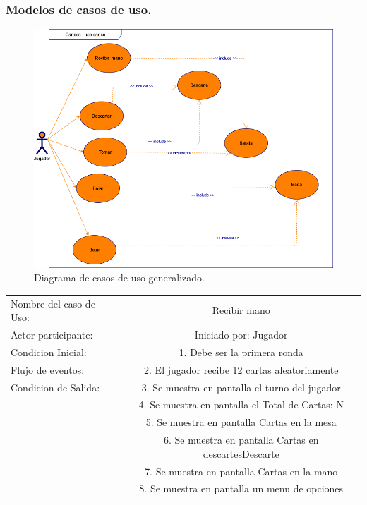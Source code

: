\documentclass[60pt]{article}
\begin{document}
\subsubsection{Modelos de casos de uso.}\label{cap:modelos-casos-uso}
\clearpage
\begin{figure}[h]
    \centering
    \includegraphics[width=15cm]{use-cases.png}
    \caption{Diagrama de casos de uso generalizado.}
\end{figure}
\begin{center}
    \begin{tabular}{ l | c  }
        Nombre del caso de Uso: & Recibir mano \\
        Actor participante: & Iniciado por: Jugador \\\hline
        Condicion Inicial: & 1. Debe ser la primera ronda    \\
        Flujo de eventos: & 2. El jugador recibe 12 cartas aleatoriamente \\\hline
        Condicion de Salida: & 3. Se muestra en pantalla el turno del jugador \\
        & 4. Se muestra en pantalla el Total de Cartas: N \\
        & 5. Se muestra en pantalla Cartas en la mesa \\
        & 6. Se muestra en pantalla Cartas en descartes\gls{Descarte} \\
        & 7. Se muestra en pantalla Cartas en la mano \\
        & 8. Se muestra en pantalla un menu de opciones \\ 
    \end{tabular} \\
\end{center}
\end{document}
